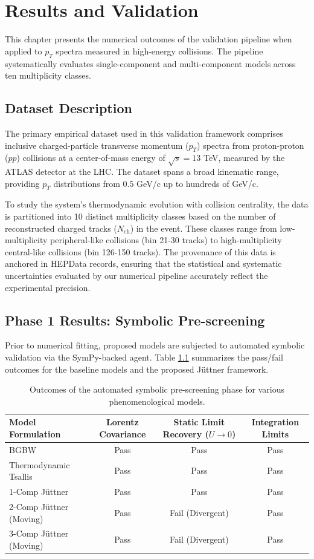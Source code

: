 \chapter{Results and Validation}
\label{ch:results_and_validation}

This chapter presents the numerical outcomes of the validation pipeline when applied to $p_T$ spectra measured in high-energy collisions. The pipeline systematically evaluates single-component and multi-component models across ten multiplicity classes.

\section{Dataset Description}
The primary empirical dataset used in this validation framework comprises inclusive charged-particle transverse momentum ($p_T$) spectra from proton-proton ($pp$) collisions at a center-of-mass energy of $\sqrt{s} = 13$ TeV, measured by the ATLAS detector at the LHC. The dataset spans a broad kinematic range, providing $p_T$ distributions from $0.5$ GeV/c up to hundreds of GeV/c. 

To study the system's thermodynamic evolution with collision centrality, the data is partitioned into 10 distinct multiplicity classes based on the number of reconstructed charged tracks ($N_{\text{ch}}$) in the event. These classes range from low-multiplicity peripheral-like collisions (bin 21-30 tracks) to high-multiplicity central-like collisions (bin 126-150 tracks). The provenance of this data is anchored in HEPData records, ensuring that the statistical and systematic uncertainties evaluated by our numerical pipeline accurately reflect the experimental precision.

\section{Phase 1 Results: Symbolic Pre-screening}
Prior to numerical fitting, proposed models are subjected to automated symbolic validation via the SymPy-backed agent. Table \ref{tab:symbolic_checks} summarizes the pass/fail outcomes for the baseline models and the proposed J\"uttner framework.

\begin{table}[h]
\centering
\caption{Outcomes of the automated symbolic pre-screening phase for various phenomenological models.}
\label{tab:symbolic_checks}
\begin{tabular}{|l|c|c|c|}
\hline
\textbf{Model Formulation} & \textbf{Lorentz Covariance} & \textbf{Static Limit Recovery ($U \to 0$)} & \textbf{Integration Limits} \\ \hline
BGBW & Pass & Pass & Pass \\ \hline
Thermodynamic Tsallis & Pass & Pass & Pass \\ \hline
1-Comp J\"uttner & Pass & Pass & Pass \\ \hline
2-Comp J\"uttner (Moving) & Pass & Fail (Divergent) & Pass \\ \hline
3-Comp J\"uttner (Moving) & Pass & Fail (Divergent) & Pass \\ \hline
\end{tabular}
\end{table}

